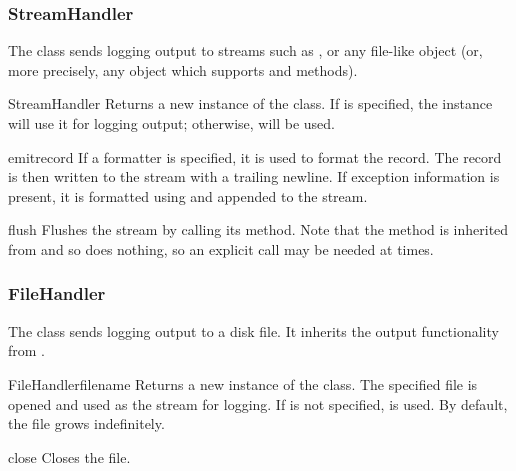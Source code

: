 \subsubsection{StreamHandler}

The  class sends logging output to streams such as
,  or any file-like object (or, more
precisely, any object which supports  and 
methods).

\begin{classdesc}{StreamHandler}{}
Returns a new instance of the  class. If  is
specified, the instance will use it for logging output; otherwise,
 will be used.
\end{classdesc}

\begin{methoddesc}{emit}{record}
If a formatter is specified, it is used to format the record.
The record is then written to the stream with a trailing newline.
If exception information is present, it is formatted using
 and appended to the stream.
\end{methoddesc}

\begin{methoddesc}{flush}{}
Flushes the stream by calling its  method. Note that
the  method is inherited from  and
so does nothing, so an explicit  call may be needed
at times.
\end{methoddesc}

\subsubsection{FileHandler}

The  class sends logging output to a disk file.
It inherits the output functionality from .

\begin{classdesc}{FileHandler}{filename}
Returns a new instance of the  class. The specified
file is opened and used as the stream for logging. If  is
not specified,  is used. By default, the file grows
indefinitely.
\end{classdesc}

\begin{methoddesc}{close}{}
Closes the file.
\end{methoddesc}

